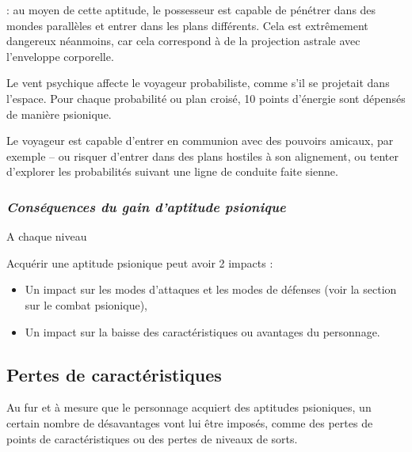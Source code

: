 \documentclass[11pt]{article}
\newcommand{\uline}[1]{\underline{\smash{#1}\vphantom{T}}\vphantom{#1}}
\begin{document}
{\bigskip

\textbf{\uline{Voyage probabiliste (spécial)}} : au moyen de cette aptitude, le possesseur est capable de pénétrer dans des mondes parallèles et entrer dans les plans différents. Cela est extrêmement dangereux néanmoins, car cela correspond à de la projection astrale avec l'enveloppe corporelle.

\bigskip

Le vent psychique affecte le voyageur probabiliste, comme s'il se projetait dans l'espace. Pour chaque probabilité ou plan croisé, 10 points d'énergie sont dépensés de manière psionique.

\bigskip

Le voyageur est capable d'entrer en communion avec des pouvoirs amicaux, par exemple -- ou risquer d'entrer dans des plans hostiles à son alignement, ou tenter d'explorer les probabilités suivant une ligne de conduite faite sienne.

\newpage
\subsubsection*{\textit{Conséquences du gain d'aptitude psionique}}

A chaque niveau %

Acquérir une aptitude psionique peut avoir 2 impacts :
\begin{itemize}
\item Un impact sur les modes d'attaques et les modes de défenses (voir la section sur le combat psionique),
\item Un impact sur la baisse des caractéristiques ou avantages du personnage.
\end{itemize}

\subsection*{Pertes de caractéristiques}

Au fur et à mesure que le personnage acquiert des aptitudes psioniques, un certain nombre de désavantages vont lui être imposés, comme des pertes de points de caractéristiques ou des pertes de niveaux de sorts.

}
\end{document}
